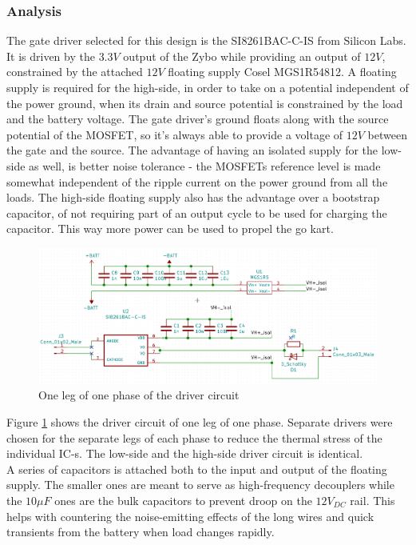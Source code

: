 \subsubsection{Analysis}
The gate driver selected for this design is the SI8261BAC-C-IS\cite{Si8261} from Silicon Labs. It is driven by the $3.3V$ output of the Zybo while providing an output of $12V$, constrained by the attached $12V$ floating supply Cosel MGS1R54812\cite{MGS1R5}. A floating supply is required for the high-side, in order to take on a potential independent of the power ground, when its drain and source potential is constrained by the load and the battery voltage. The gate driver's ground floats along with the source potential of the MOSFET, so it's always able to provide a voltage of $12V$ between the gate and the source. The advantage of having an isolated supply for the low-side as well, is better noise tolerance - the MOSFETs reference level is made somewhat independent of the ripple current on the power ground from all the loads. The high-side floating supply also has the advantage over a bootstrap capacitor, of not requiring part of an output cycle to be used for charging the capacitor. This way more power can be used to propel the go kart.

\begin{figure}[H]
	\centering
	\includegraphics[width=1\linewidth]{pictures/hardware/Driver_Board/driver_circuit.png}
	\caption{One leg of one phase of the driver circuit}
	\label{fig:driver_circuit}
\end{figure}

Figure \ref{fig:driver_circuit} shows the driver circuit of one leg of one phase. Separate drivers were chosen for the separate legs of each phase to reduce the thermal stress of the individual IC-s. The low-side and the high-side driver circuit is identical. \\

A series of capacitors is attached both to the input and output of the floating supply. The smaller ones are meant to serve as high-frequency decouplers while the $10$$\mu$$F$  ones are the bulk capacitors to prevent droop on the $12V_{DC}$ rail. This helps with countering the noise-emitting effects of the long wires and quick transients from the battery when load changes rapidly. \\


